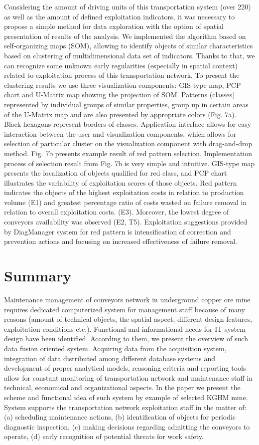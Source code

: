 Considering the amount of driving units of this transportation system (over 220) as well as the amount of defined exploitation indicators, it was necessary to propose a simple method for data exploration with the option of spatial presentation of results of the analysis. We implemented the algorithm based on self-organizing maps (SOM), allowing to identify objects of similar characteristics based on clustering of multidimensional data set of indicators. Thanks to that, we can recognize some unknown early regularities (especially in spatial context) related to exploitation process of this transportation network. To present the clustering results we use three visualization components: GIS-type map, PCP chart and U-Matrix map showing the projection of SOM. Patterns (classes) represented by individual groups of similar properties, group up in certain areas of the U-Matrix map and are also presented by appropriate colors (Fig. 7a). Black hexagons represent borders of classes. Application interface allows for easy interaction between the user and visualization components, which allows for selection of particular cluster on the visualization component with drag-and-drop method. Fig. 7b presents example result of red pattern selection. Implementation process of selection result from Fig. 7b is very simple and intuitive. GIS-type map presents the localization of objects qualified for red class, and PCP chart illustrates the variability of exploitation scores of those objects. Red pattern indicates the objects of the highest exploitation costs in relation to production volume (E1) and greatest percentage ratio of costs wasted on failure removal in relation to overall exploitation costs. (E3). Moreover, the lowest degree of conveyors availability was observed (E2, T5). Exploitation suggestions provided by DiagManager system for red pattern is intensification of correction and prevention actions and focusing on increased effectiveness of failure removal. 

\section{Summary}
Maintenance management of conveyors network in underground copper ore mine requires dedicated computerized system for management staff because of many reasons (amount of technical objects, the spatial aspect, different design features, exploitation conditions etc.). Functional and informational needs for IT system design have been identified. According to them, we present the overview of such data fusion oriented system. Acquiring data from the acquisition system, integration of data distributed among different database systems and development of proper analytical models, reasoning criteria and reporting tools allow for constant monitoring of transportation network and maintenance staff in technical, economical and organizational aspects. In the paper we present the scheme and functional idea of such system by example of selected KGHM mine. System supports the transportation network exploitation staff in the matter of: (a) scheduling maintenance actions, (b) identification of objects for periodic diagnostic inspection, (c) making decisions regarding admitting the conveyors to operate, (d) early recognition of potential threats for work safety.

